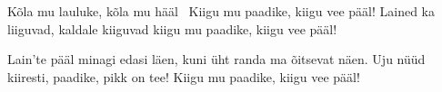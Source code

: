 K\~ola mu lauluke, k\~ola mu h\"a\"al~
Kiigu mu paadike, kiigu vee p\"a\"al!
Lained ka liiguvad, 
kaldale kiiguvad
kiigu mu paadike, kiigu vee p\"a\"al!

Lain'te p\"a\"al minagi edasi l\"aen,
kuni \"uht randa ma \~oitsevat n\"aen.
Uju n\"u\"ud kiiresti,
paadike, pikk on tee!
Kiigu mu paadike, kiigu vee p\"a\"al!